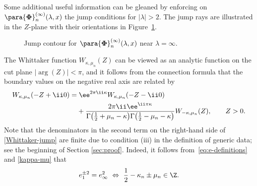 Some additional useful information can be gleaned by enforcing on
$\para{\boldsymbol{\Phi}}_n^{(\infty)}(\lambda,x)$ the jump conditions for $|\lambda|>2$. The jump rays are illustrated in the $Z$-plane with their orientations in Figure~\ref{fig1}.
\begin{figure}
 \centering
 \caption{Jump contour for $\para{\boldsymbol{\Phi}}_n^{(\infty)}(\lambda,x)$ near $\lambda=\infty$.}
\label{fig1}
\end{figure}
The Whittaker function $W_{\kappa,\mu_n}(Z)$ can be viewed as an analytic function on the cut plane $|{\arg}(Z)|<\pi$, and it follows from the connection formula \cite[equation~(13.14.13)]{DLMF} that the boundary values on the negative real axis are related by
\begin{align}
&W_{\kappa,\mu_n}(-Z+\ii 0)= \ee^{2\pi \ii\kappa}W_{\kappa,\mu_n}(-Z-\ii 0)\nonumber \\
&\hphantom{W_{\kappa,\mu_n}(-Z+\ii 0)=}{} +
 \frac{2\pi \ii\ee^{\ii\pi\kappa}}{\Gamma\big(\frac{1}{2}+\mu_n-\kappa\big)\Gamma\big(\frac{1}{2}-\mu_n-\kappa\big)}W_{-\kappa,\mu_n}(Z),\qquad Z>0.
\label{Whittaker-jump}
\end{align}
Note that the denominators in the second term on the right-hand side of \eqref{Whittaker-jump} are finite due to condition (iii) in the definition of generic data; see the beginning of Section \ref{sec:proof}. Indeed, it follows from~\eqref{eq:e-definitions} and \eqref{kappa-mu} that
\[
e_1^{\pm 2} = e_\infty^2 \ \Leftrightarrow \ \frac{1}{2} - \kappa_n \pm \mu_n \in \Z.
\]

